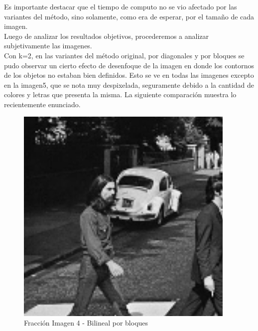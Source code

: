 \documentclass[a4paper]{article}
\newcounter{col}
\begin{document}
Es importante destacar que el tiempo de computo no se vio afectado por las variantes del m\'etodo, sino solamente, como era de esperar, por el tamaño de cada imagen.\\
Luego de analizar los resultados objetivos, procederemos a analizar subjetivamente las imagenes.\\
Con k=2, en las variantes del m\'etodo original, por diagonales y por bloques se pudo observar un cierto efecto de desenfoque de la imagen en donde los contornos de los objetos no estaban bien definidos. Esto se ve en todas las imagenes excepto en la imagen5, que se nota muy despixelada, seguramente debido a la cantidad de colores y letras que presenta la misma.
La siguiente comparaci\'on muestra lo recientemente enunciado.\\


    \begin{figure}[H]
    \centering
    \includegraphics[scale=0.5]{imagenes/imagen4informe.png}
    \caption{Fracci\'on Imagen 4 - Bilineal por bloques}
    \end{figure}
\end{document}

